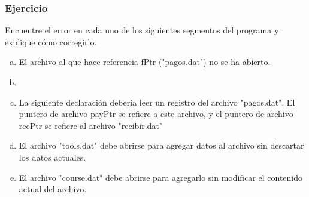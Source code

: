 \subsubsection*{Ejercicio}
Encuentre el error en cada uno de los siguientes segmentos del programa y explique cómo corregirlo.
\begin{enumerate}[a)]
  \item El archivo al que hace referencia fPtr ("pagos.dat") no se ha abierto.
    \lstset{inputencoding=utf8/latin1}
    
  \item \ \ \ 
    
  \item La siguiente declaración debería leer un registro del archivo "pagos.dat". 
    El puntero de archivo payPtr se refiere a este archivo, y el puntero de archivo recPtr se refiere al archivo "recibir.dat"
    
  \item El archivo "tools.dat" debe abrirse para agregar datos al archivo sin descartar los datos actuales.
    
  \item El archivo "course.dat" debe abrirse para agregarlo sin modificar el contenido actual del archivo.
    
\end{enumerate}



